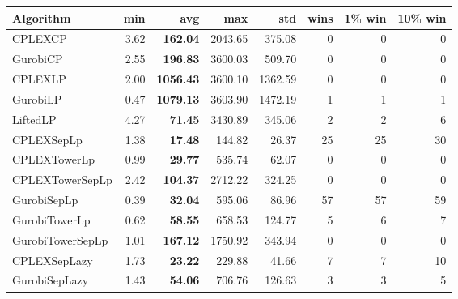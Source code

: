 \begin{tabular}{lrrrrrrr}
Algorithm & min & avg & max & std
& wins & 1\% win & 10\% win 
\\
\hline
CPLEXCP&3.62& \bf162.04& 2043.65& 375.08&0&0&0\\
GurobiCP&2.55& \bf196.83& 3600.03& 509.70&0&0&0\\
CPLEXLP&2.00& \bf1056.43& 3600.10& 1362.59&0&0&0\\
GurobiLP&0.47& \bf1079.13& 3603.90& 1472.19&1&1&1\\
LiftedLP&4.27& \bf71.45& 3430.89& 345.06&2&2&6\\
CPLEXSepLp&1.38& \bf17.48& 144.82& 26.37&25&25&30\\
CPLEXTowerLp&0.99& \bf29.77& 535.74& 62.07&0&0&0\\
CPLEXTowerSepLp&2.42& \bf104.37& 2712.22& 324.25&0&0&0\\
GurobiSepLp&0.39& \bf32.04& 595.06& 86.96&57&57&59\\
GurobiTowerLp&0.62& \bf58.55& 658.53& 124.77&5&6&7\\
GurobiTowerSepLp&1.01& \bf167.12& 1750.92& 343.94&0&0&0\\
CPLEXSepLazy&1.73& \bf23.22& 229.88& 41.66&7&7&10\\
GurobiSepLazy&1.43& \bf54.06& 706.76& 126.63&3&3&5
\end{tabular}
